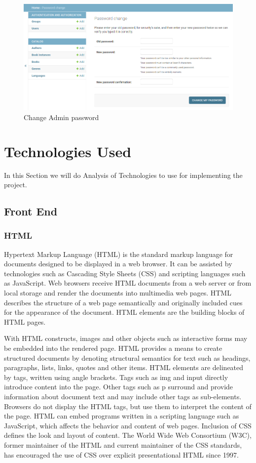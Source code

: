 \documentclass[12pt, a4paper]{report}
\begin{document}
\newpage
\begin{figure}[htb]
	\centering
	\includegraphics[scale=0.5]{./password-change} 
	\caption{Change Admin password}
	\label{fig:password-change} 
\end{figure}

\newpage
\section{Technologies Used}

In this Section we will do Analysis of Technologies to use for implementing the project.
\subsection{Front End}
\subsubsection{HTML}
Hypertext Markup Language (HTML) is the standard markup language for documents designed to
be displayed in a web browser. It can be assisted by technologies such as Cascading Style Sheets
(CSS) and scripting languages such as JavaScript.
Web browsers receive HTML documents from a
web server or from local storage and render the documents into multimedia web pages. HTML
describes the structure of a web page semantically and originally included cues for the appearance
of the document.
HTML elements are the building blocks of HTML pages.\par With HTML constructs, images and other
objects such as interactive forms may be embedded into the rendered page. HTML provides a
means to create structured documents by denoting structural semantics for text such as headings,
paragraphs, lists, links, quotes and other items. HTML elements are delineated by tags, written
using angle brackets. Tags such as img and input directly introduce content into the page.
Other tags such as p surround and provide information about document text and may include
other tags as sub-elements. Browsers do not display the HTML tags, but use them to interpret the
content of the page.
HTML can embed programs written in a scripting language such as JavaScript, which affects the
behavior and content of web pages. Inclusion of CSS defines the look and layout of content. The
World Wide Web Consortium (W3C), former maintainer of the HTML and current maintainer of the
CSS standards, has encouraged the use of CSS over explicit presentational HTML since 1997.
\end{document}
